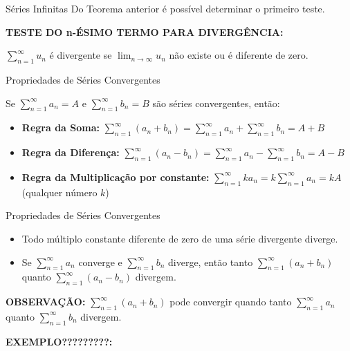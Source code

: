 \documentclass[hyperref={pdfpagelabels=false}]{beamer}
\begin{document}
\begin{frame}{Séries Infinitas}
    Do Teorema anterior é possível determinar o primeiro teste. \pause
    
    {\bf TESTE DO n-ÉSIMO TERMO PARA DIVERGÊNCIA:} 
    
    $\displaystyle \sum_{n=1}^{\infty}u_n$ é divergente se $\displaystyle \lim_{n\to \infty}u_n$ não existe ou é diferente de zero.
\end{frame}

\begin{frame}{Propriedades de Séries Convergentes}
    \begin{theorem}
        Se $\displaystyle \sum_{n=1}^{\infty}a_n = A$ e $\displaystyle \sum_{n=1}^{\infty}b_n =B$ são séries convergentes, então:
        \begin{itemize}
            \item {\bf Regra da Soma:} $\displaystyle \sum_{n=1}^{\infty}(a_n + b_n) = \displaystyle \sum_{n=1}^{\infty}a_n + \displaystyle \sum_{n=1}^{\infty}b_n = A + B$ \pause
            \item {\bf Regra da Diferença:} $\displaystyle \sum_{n=1}^{\infty}(a_n - b_n) = \displaystyle \sum_{n=1}^{\infty}a_n - \displaystyle \sum_{n=1}^{\infty}b_n = A - B$ \pause
            \item {\bf Regra da Multiplicação por constante:} $\displaystyle \sum_{n=1}^{\infty}ka_n = \displaystyle k \sum_{n=1}^{\infty}a_n = kA$ (qualquer  número $k$)
        \end{itemize} 

    \end{theorem}

\end{frame}

\begin{frame}{Propriedades de Séries Convergentes}
    \begin{corollary}
        \begin{itemize}
            \item Todo múltiplo constante diferente de zero de uma série divergente diverge. \pause
            \item Se $\displaystyle \sum_{n=1}^{\infty}a_n$ converge e $\displaystyle \sum_{n=1}^{\infty}b_n$ diverge, então tanto $\displaystyle \sum_{n=1}^{\infty}(a_n + b_n)$ quanto $\displaystyle \sum_{n=1}^{\infty}(a_n - b_n)$ divergem.
        \end{itemize}
    \end{corollary} \pause
    
{\bf OBSERVAÇÃO:} $\displaystyle \sum_{n=1}^{\infty}(a_n + b_n)$ pode convergir quando tanto $\displaystyle \sum_{n=1}^{\infty}a_n$ quanto $\displaystyle \sum_{n=1}^{\infty}b_n$ divergem. \pause

{\bf EXEMPLO?????????:}
    
\end{frame}
\end{document}
